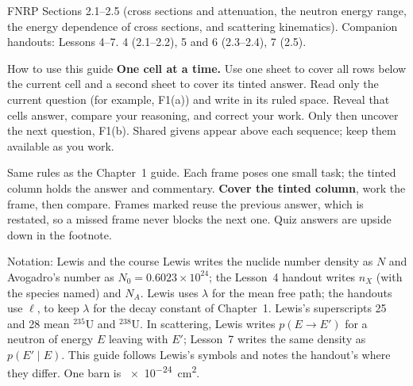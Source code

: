 \documentclass[compact]{ne630handout}
\newcommand{\iso}[2]{\ensuremath{{}^{#1}\mathrm{#2}}}
\begin{document}
 {FNRP Sections 2.1--2.5 (cross sections and attenuation, the neutron energy range, the energy dependence of cross sections, and scattering kinematics). Companion handouts: Lessons 4--7.}
 {4 (2.1--2.2), 5 and 6 (2.3--2.4), 7 (2.5).}

\begin{KeyBox}{How to use this guide}
\ifguidehandwriting
\textbf{One cell at a time.} Use one sheet to cover all rows below the current cell and a second sheet to cover its tinted answer. Read only the current question (for example, F1(a)) and write in its ruled space. Reveal that cell\textquotesingle s answer, compare your reasoning, and correct your work. Only then uncover the next question, F1(b). Shared givens appear above each sequence; keep them available as you work.\par\smallskip
\fi
Same rules as the Chapter~1 guide. Each frame poses one small task; the tinted column holds the answer and commentary. \textbf{Cover the tinted column}, work the frame, then compare. Frames marked \Chain reuse the previous answer, which is restated, so a missed frame never blocks the next one. Quiz answers are upside down in the footnote.
\end{KeyBox}

\begin{KeyBox}{Notation: Lewis and the course}
Lewis writes the nuclide number density as $N$ and Avogadro's number as $N_0=0.6023\times10^{24}$; the Lesson~4 handout writes $n_X$ (with the species named) and $N_A$. Lewis uses $\lambda$ for the mean free path; the handouts use $\ell$, to keep $\lambda$ for the decay constant of Chapter~1. Lewis's superscripts 25 and 28 mean \iso{235}{U} and \iso{238}{U}. In scattering, Lewis writes $p(E\to E')$ for a neutron of energy $E$ leaving with $E'$; Lesson~7 writes the same density as $p(E'\mid E)$. This guide follows Lewis's symbols and notes the handout's where they differ. One barn is \SI{e-24}{\centi\meter\squared}.
\end{KeyBox}
\end{document}
